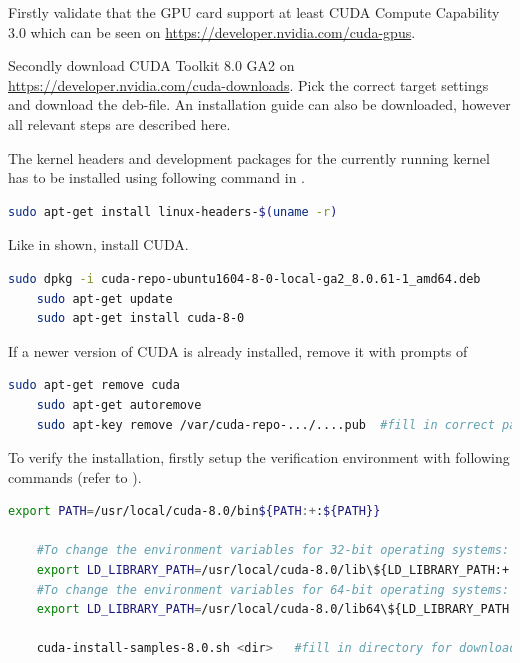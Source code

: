 Firstly validate that the GPU card support at least CUDA Compute Capability 3.0 which can be seen on \url{https://developer.nvidia.com/cuda-gpus}.

Secondly download CUDA Toolkit 8.0 GA2 on \url{https://developer.nvidia.com/cuda-downloads}. Pick the correct target settings and download the deb-file. An installation guide can also be downloaded, however all relevant steps are described here.

The kernel headers and development packages for the currently running kernel has to be installed using following command in .

\begin{minipage}{\linewidth}
\begin{lstlisting}[caption=Installation of linux-headers, label=list:linuxheaders, language=bash]
	sudo apt-get install linux-headers-$(uname -r)
\end{lstlisting}
\end{minipage}

Like in  shown, install CUDA.

\begin{minipage}{\linewidth}
\begin{lstlisting}[caption=Installation of CUDA, label=list:cuda, language=bash]
	sudo dpkg -i cuda-repo-ubuntu1604-8-0-local-ga2_8.0.61-1_amd64.deb
	sudo apt-get update
	sudo apt-get install cuda-8-0
\end{lstlisting}
\end{minipage}

If a newer version of CUDA is already installed, remove it with prompts of 

\begin{minipage}{\linewidth}
\begin{lstlisting}[caption=Remove CUDA, label=list:cudaUninstall, language=bash]
	sudo apt-get remove cuda
	sudo apt-get autoremove
	sudo apt-key remove /var/cuda-repo-.../....pub	#fill in correct path/file
\end{lstlisting}
\end{minipage}

To verify the installation, firstly setup the verification environment with following commands (refer to ). 

\begin{minipage}{\linewidth}
\begin{lstlisting}[caption=Setup CUDA verification environment, label=list:cudaVerifyEnv, language=bash]
	export PATH=/usr/local/cuda-8.0/bin${PATH:+:${PATH}}
	
	#To change the environment variables for 32-bit operating systems:
	export LD_LIBRARY_PATH=/usr/local/cuda-8.0/lib\${LD_LIBRARY_PATH:+:${LD_LIBRARY_PATH}}
	#To change the environment variables for 64-bit operating systems:
	export LD_LIBRARY_PATH=/usr/local/cuda-8.0/lib64\${LD_LIBRARY_PATH:+:${LD_LIBRARY_PATH}}
	
	cuda-install-samples-8.0.sh <dir>	#fill in directory for downloaded samples
\end{lstlisting}
\end{minipage}


